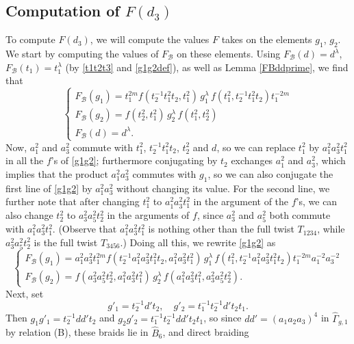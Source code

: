 \documentclass[a4paper,10pt,reqno]{amsart}
\newcommand\B{\widehat{B}}
\newcommand\GGone{\widehat{\Gamma}_{g,1}}
\begin{document}
\subsection{Computation of $F(d_3)$}\label{CompFd3} To compute $F(d_3)$, we will compute the values 
$F$ takes on the elements $g_1$, $g_2$.  We start by computing the values of $F_{\mathcal{B}}$
on these elements. Using $F_{\mathcal{B}}(d)=d^\lambda$, $F_{\mathcal{B}}(t_1)=t_1^\lambda$ 
(by \eqref{t1t2t3} and \eqref{g1g2def}), as well as Lemma \ref{FBddprime}, we find that
\begin{equation}\label{g1g2}
\begin{cases}
F_{\mathcal{B}}(g_1)=t_1^{2m}f(t_2^{-1}t_1^2t_2,t_1^2)\,g_1^\lambda \,
f(t_1^2,t_2^{-1}t_1^2t_2)t_1^{-2m}\\
F_{\mathcal{B}}(g_2)=f(t_2^2,t_1^2)\,g_2^\lambda\, f(t_1^2,t_2^2)\\
F_{\mathcal{B}}(d)=d^\lambda.
\end{cases}
\end{equation}
Now, $a_1^2$ and $a_3^2$ commute with $t_1^2$, $t_2^{-1}t_1^2t_2$, $t_2^2$ and $d$, so
we can replace $t_1^2$ by $a_1^2a_3^2t_1^2$ in all the $f$'s of \eqref{g1g2}; furthermore
conjugating by $t_2$ exchanges $a_1^2$ and $a_3^2$, which implies that the product
$a_1^2a_3^2$ commutes with $g_1$,
so we can also conjugate the
first line of \eqref{g1g2} by $a_1^2a_3^2$ without changing its value. For the second line,
we further note that after changing $t_1^2$ to $a_1^2a_3^2t_1^2$ in the argument of the $f$'s,
we can also change $t_2^2$ to $a_3^2a_5^2t_2^2$ in the arguments of $f$, since
$a_3^2$ and $a_5^2$ both commute with $a_1^2a_3^2t_1^2$.  (Observe that $a_1^2a_3^2t_1^2$ is 
nothing other than the full twist $T_{1234}$, while $a_3^2a_5^2t_2^2$ is the full twist $T_{3456}$.) 
Doing all this, we rewrite \eqref{g1g2} as
\begin{equation}\label{g1g2bis}
\begin{cases}
F_{\mathcal{B}}(g_1)=a_1^2a_3^2t_1^{2m}f(t_2^{-1}a_1^2a_3^2t_1^2t_2,a_1^2a_3^2t_1^2)\,g_1^\lambda \,
f(t_1^2,t_2^{-1}a_1^2a_3^2t_1^2t_2)t_1^{-2m}a_1^{-2}a_3^{-2}\\
F_{\mathcal{B}}(g_2)=f(a_3^2a_5^2t_2^2,a_1^2a_3^2t_1^2)\,g_2^\lambda\, f(a_1^2a_3^2t_1^2,a_3^2a_5^2t_2^2).
\end{cases}
\end{equation}
Next, set
$$g'_1=t_2^{-1}d't_2, \quad g'_2=t_1^{-1}t_2^{-1}d't_2t_1.$$ 
Then $g_1g'_1=t_2^{-1}dd't_2$ and $g_2g'_2=t_1^{-1}t_2^{-1}dd't_2t_1$, so since 
$dd'=(a_1a_2a_3)^4$ in $\GGone$ by relation (B), these braids lie in $\B_6$, and direct braiding
\end{document}
